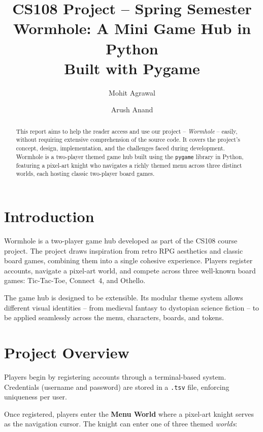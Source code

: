 \documentclass[12pt, a4paper]{article}
\title{
    \vspace{-1cm}
    {\Large \textbf{CS108 Project -- Spring Semester}} \\[0.4cm]
    {\huge \textbf{Wormhole: A Mini Game Hub in Python}} \\[0.3cm]
    {\large Built with Pygame}
    \vspace{0.3cm}
}
\author{
    Mohit Agrawal \and Arush Anand
}
\begin{document}
\maketitle
\thispagestyle{fancy}

\begin{abstract}
This report aims to help the reader access and use our project -- \textit{Wormhole} -- easily, without requiring extensive comprehension of the source code. It covers the project's concept, design, implementation, and the challenges faced during development. Wormhole is a two-player themed game hub built using the \texttt{pygame} library in Python, featuring a pixel-art knight who navigates a richly themed menu across three distinct worlds, each hosting classic two-player board games.
\end{abstract}

\tableofcontents
\newpage

\section{Introduction}

Wormhole is a two-player game hub developed as part of the CS108 course project. The project draws inspiration from retro RPG aesthetics and classic board games, combining them into a single cohesive experience. Players register accounts, navigate a pixel-art world, and compete across three well-known board games: Tic-Tac-Toe, Connect~4, and Othello.

The game hub is designed to be extensible. Its modular theme system allows different visual identities -- from medieval fantasy to dystopian science fiction -- to be applied seamlessly across the menu, characters, boards, and tokens.

\section{Project Overview}

Players begin by registering accounts through a terminal-based system. Credentials (username and password) are stored in a \texttt{.tsv} file, enforcing uniqueness per user.

Once registered, players enter the \textbf{Menu World} where a pixel-art knight serves as the navigation cursor. The knight can enter one of three themed \textit{worlds}:
\end{document}
